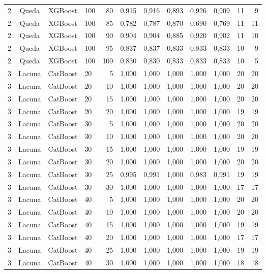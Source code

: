 \begin{longtable}{ccclrrrrrrrr}
2 & Queda & XGBoost & 100 & 80 & 0,915 & 0,916 & 0,893 & 0,926 & 0,909 & 11 & 9 \\
2 & Queda & XGBoost & 100 & 85 & 0,782 & 0,787 & 0,870 & 0,690 & 0,769 & 11 & 11 \\
2 & Queda & XGBoost & 100 & 90 & 0,904 & 0,904 & 0,885 & 0,920 & 0,902 & 11 & 10 \\
2 & Queda & XGBoost & 100 & 95 & 0,837 & 0,837 & 0,833 & 0,833 & 0,833 & 10 & 9 \\
2 & Queda & XGBoost & 100 & 100 & 0,830 & 0,830 & 0,833 & 0,833 & 0,833 & 10 & 5 \\
3 & Lacuna & CatBoost & 20 & 5 & 1,000 & 1,000 & 1,000 & 1,000 & 1,000 & 20 & 20 \\
3 & Lacuna & CatBoost & 20 & 10 & 1,000 & 1,000 & 1,000 & 1,000 & 1,000 & 20 & 20 \\
3 & Lacuna & CatBoost & 20 & 15 & 1,000 & 1,000 & 1,000 & 1,000 & 1,000 & 20 & 20 \\
3 & Lacuna & CatBoost & 20 & 20 & 1,000 & 1,000 & 1,000 & 1,000 & 1,000 & 19 & 19 \\
3 & Lacuna & CatBoost & 30 & 5 & 1,000 & 1,000 & 1,000 & 1,000 & 1,000 & 20 & 20 \\
3 & Lacuna & CatBoost & 30 & 10 & 1,000 & 1,000 & 1,000 & 1,000 & 1,000 & 20 & 20 \\
3 & Lacuna & CatBoost & 30 & 15 & 1,000 & 1,000 & 1,000 & 1,000 & 1,000 & 19 & 19 \\
3 & Lacuna & CatBoost & 30 & 20 & 1,000 & 1,000 & 1,000 & 1,000 & 1,000 & 20 & 20 \\
3 & Lacuna & CatBoost & 30 & 25 & 0,995 & 0,991 & 1,000 & 0,983 & 0,991 & 19 & 19 \\
3 & Lacuna & CatBoost & 30 & 30 & 1,000 & 1,000 & 1,000 & 1,000 & 1,000 & 17 & 17 \\
3 & Lacuna & CatBoost & 40 & 5 & 1,000 & 1,000 & 1,000 & 1,000 & 1,000 & 20 & 20 \\
3 & Lacuna & CatBoost & 40 & 10 & 1,000 & 1,000 & 1,000 & 1,000 & 1,000 & 20 & 20 \\
3 & Lacuna & CatBoost & 40 & 15 & 1,000 & 1,000 & 1,000 & 1,000 & 1,000 & 19 & 19 \\
3 & Lacuna & CatBoost & 40 & 20 & 1,000 & 1,000 & 1,000 & 1,000 & 1,000 & 17 & 17 \\
3 & Lacuna & CatBoost & 40 & 25 & 1,000 & 1,000 & 1,000 & 1,000 & 1,000 & 19 & 19 \\
3 & Lacuna & CatBoost & 40 & 30 & 1,000 & 1,000 & 1,000 & 1,000 & 1,000 & 18 & 18 \\

\end{longtable}
